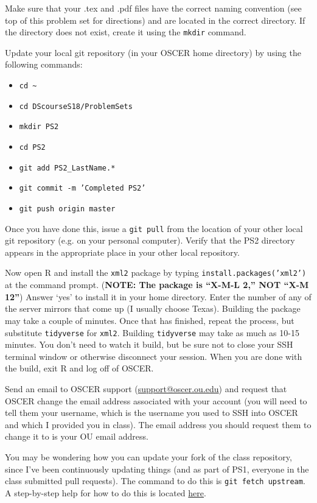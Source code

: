 \documentclass[12pt,english]{exam}
\begin{document}
\begin{questions}
\question Make sure that your .tex and .pdf files have the correct naming convention (see top of this problem set for directions) and are located in the correct directory. If the directory does not exist, create it using the \texttt{mkdir} command.

\question Update your local git repository (in your OSCER home directory) by using the following commands:
\begin{itemize}
	\item \texttt{cd \~}
	\item \texttt{cd DScourseS18/ProblemSets}
	\item \texttt{mkdir PS2}
	\item \texttt{cd PS2}
	\item \texttt{git add PS2\_LastName.*}
	\item \texttt{git commit -m 'Completed PS2'}
	\item \texttt{git push origin master}
\end{itemize}
Once you have done this, issue a \texttt{git pull} from the location of your other local git repository (e.g. on your personal computer). Verify that the PS2 directory appears in the appropriate place in your other local repository.

\question Now open R and install the \texttt{xml2} package by typing \texttt{install.packages('xml2')} at the command prompt. (\textbf{NOTE: The package is ``X-M-L 2,'' NOT ``X-M 12''}) Answer `yes' to install it in your home directory. Enter the number of any of the server mirrors that come up (I usually choose Texas). Building the package may take a couple of minutes. Once that has finished, repeat the process, but substitute \texttt{tidyverse} for \texttt{xml2}. Building \texttt{tidyverse} may take as much as 10-15 minutes. You don't need to watch it build, but be sure not to close your SSH terminal window or otherwise disconnect your session. When you are done with the build, exit R and log off of OSCER.

\question Send an email to OSCER support (\href{mailto:support@oscer.ou.edu}{support@oscer.ou.edu}) and request that OSCER change the email address associated with your account (you will need to tell them your username, which is the username you used to SSH into OSCER and which I provided you in class). The email address you should request them to change it to is your OU email address.

\question You may be wondering how you can update your fork of the class repository, since I've been continuously updating things (and as part of PS1, everyone in the class submitted pull requests). The command to do this is \texttt{git fetch upstream}. A step-by-step help for how to do this is located \href{https://help.github.com/articles/syncing-a-fork/}{here}.

\end{questions}
\end{document}
